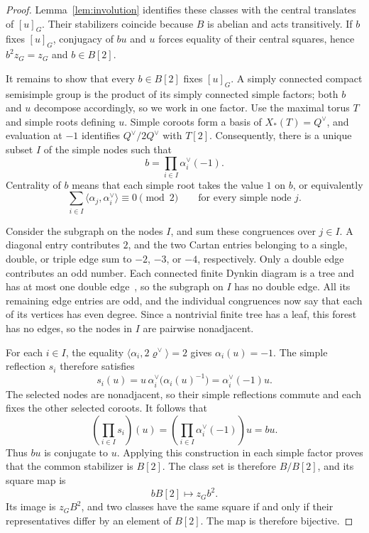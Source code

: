 \documentclass[11pt,a4paper,reqno]{amsart}
\theoremstyle{plain}
\theoremstyle{definition}
\theoremstyle{remark}
\numberwithin{equation}{section}
\newcommand{\pair}[2]{\langle #1,#2\rangle}
\newcommand{\rh}{\varrho^\vee}
\begin{document}
\begin{proof}
Lemma~\ref{lem:involution} identifies these classes with the central translates of $[u]_G$. Their stabilizers coincide because $B$ is abelian and acts transitively. If $b$ fixes $[u]_G$, conjugacy of $bu$ and $u$ forces equality of their central squares, hence $b^2z_G=z_G$ and $b\in B[2]$.

It remains to show that every $b\in B[2]$ fixes $[u]_G$. A simply connected compact semisimple group is the product of its simply connected simple factors; both $b$ and $u$ decompose accordingly, so we work in one factor. Use the maximal torus $T$ and simple roots defining $u$. Simple coroots form a basis of $X_*(T)=Q^\vee$, and evaluation at $-1$ identifies $Q^\vee/2Q^\vee$ with $T[2]$. Consequently, there is a unique subset $I$ of the simple nodes such that
\[
b=\prod_{i\in I}\alpha_i^\vee(-1).
\]
Centrality of $b$ means that each simple root takes the value $1$ on $b$, or equivalently
\[
\sum_{i\in I}\pair{\alpha_j}{\alpha_i^\vee}
\equiv0\pmod2
\qquad\text{for every simple node }j.
\]

Consider the subgraph on the nodes $I$, and sum these congruences over $j\in I$. A diagonal entry contributes $2$, and the two Cartan entries belonging to a single, double, or triple edge sum to $-2$, $-3$, or $-4$, respectively. Only a double edge contributes an odd number. Each connected finite Dynkin diagram is a tree and has at most one double edge~\cite[\S23.8]{EtingofExponents}, so the subgraph on $I$ has no double edge. All its remaining edge entries are odd, and the individual congruences now say that each of its vertices has even degree. Since a nontrivial finite tree has a leaf, this forest has no edges, so the nodes in $I$ are pairwise nonadjacent.

For each $i\in I$, the equality $\pair{\alpha_i}{2\rh}=2$ gives $\alpha_i(u)=-1$. The simple reflection $s_i$ therefore satisfies
\[
s_i(u)=u\,\alpha_i^\vee\bigl(\alpha_i(u)^{-1}\bigr)
=\alpha_i^\vee(-1)u.
\]
The selected nodes are nonadjacent, so their simple reflections commute and each fixes the other selected coroots. It follows that
\[
\left(\prod_{i\in I}s_i\right)(u)
=\left(\prod_{i\in I}\alpha_i^\vee(-1)\right)u=bu.
\]
Thus $bu$ is conjugate to $u$. Applying this construction in each simple factor proves that the common stabilizer is $B[2]$. The class set is therefore $B/B[2]$, and its square map is
\[
bB[2]\longmapsto z_Gb^2.
\]
Its image is $z_GB^2$, and two classes have the same square if and only if their representatives differ by an element of $B[2]$. The map is therefore bijective.
\end{proof}
\end{document}
